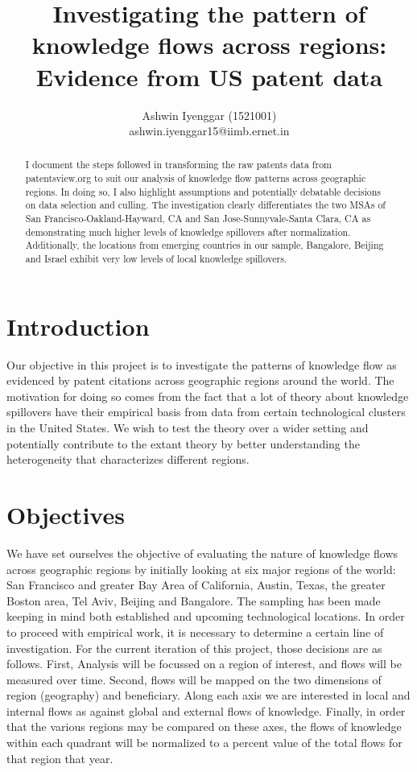 \documentclass[12pt]{article}
\begin{document}
\title{Investigating the pattern of knowledge flows across regions:\\  Evidence from US patent data}
\author{Ashwin Iyenggar  (1521001) \\ ashwin.iyenggar15@iimb.ernet.in} 


\maketitle
\thispagestyle{empty}

\begin{abstract}
I document the steps followed in transforming the raw patents data from patentsview.org to suit our analysis of knowledge flow patterns across geographic regions. In doing so, I also highlight assumptions and potentially debatable decisions on data selection and culling. The investigation clearly differentiates the two MSAs of San Francisco-Oakland-Hayward, CA and San Jose-Sunnyvale-Santa Clara, CA as demonstrating much higher levels of knowledge spillovers after normalization. Additionally, the locations from emerging countries in our sample, Bangalore, Beijing and Israel exhibit very low levels of local knowledge spillovers.
\end{abstract}

\section{Introduction}\label{S:Introduction}
Our objective in this project is to investigate the patterns of knowledge flow as evidenced by patent citations across geographic regions around the world. The motivation for doing so comes from the fact that a lot of theory about knowledge spillovers have their empirical basis from data from certain technological clusters in the United States. We wish to test the theory over a wider setting and potentially contribute to the extant theory by better understanding the heterogeneity that characterizes different regions. 

\section{Objectives}
We have set ourselves the objective of evaluating the nature of knowledge flows across geographic regions by initially looking at six major regions of the world: San Francisco and greater Bay Area of California, Austin, Texas, the greater Boston area, Tel Aviv, Beijing and Bangalore. The sampling has been made keeping in mind both established and upcoming technological locations. In order to proceed with empirical work, it is necessary to determine a certain line of investigation. For the current iteration of this project, those decisions are as follows.  First, Analysis will be focussed on a region of interest, and flows will be measured over time. Second, flows will be mapped on the two dimensions of region (geography) and beneficiary. Along each axis we are interested in local and internal flows as against global and external flows of knowledge. Finally, in order that the various regions may be compared on these axes, the flows of knowledge within each quadrant will be normalized to a percent value of the total flows for that region that year.
\end{document}
